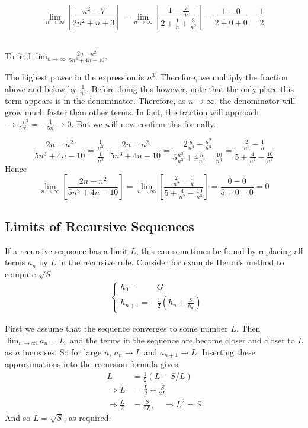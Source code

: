 \[
\lim_{n \to \infty } \left[ \frac{n^2-7}{2n^2+n+3} \right]=  \lim_{n \to \infty } \left[ \frac{1-\frac{7}{n^2}}{2+\frac{1}{n}+\frac{3}{n^2}}\right] = \frac{1-0}{2+0+0} = \frac{1}{2}
\]

\\
\noindent To find $\lim_{n \to \infty } \frac{2n-n^2}{5n^3+4n-10}$.

The highest power in the expression is $n^3$. Therefore, we multiply the fraction above and below by $\frac{1}{n^3}$. Before doing this however, note that the only place this term appears is in the denominator. Therefore, as $n \to \infty $, the denominator will grow much faster than other terms. In fact, the fraction will approach $\to \frac{-n^2}{5n^3}  = -\frac{1}{5n} \to 0$. But we will now confirm this formally.

\[
\frac{2n-n^2}{5n^3+4n-10} = \frac{\frac{1}{n^3}}{\frac{1}{n^3}}\cdot \frac{2n-n^2}{5n^3+4n-10} = \frac{2 \frac{n}{n^3}-\frac{n^2}{n^3}}{5 \frac{n^3}{n^3}+4 \frac{n}{n^3}-\frac{10}{n^3}} = \frac{\frac{2}{n^2}-\frac{1}{n}}{5+\frac{4}{n^2}-\frac{10}{n^3}}
\]
Hence
\[
\lim_{n \to \infty } \left[ \frac{2n-n^2}{5n^3+4n-10} \right]= \lim_{n \to \infty } \left[  \frac{\frac{2}{n^2}-\frac{1}{n}}{5+\frac{4}{n^2}-\frac{10}{n^3}} \right]= \frac{0-0}{5+0-0}=0
\]


\subsection*{Limits of Recursive Sequences}
If a recursive sequence has a limit $L$, this can sometimes be found by replacing all terms $a_{n}$ by $L$ in the recursive rule. Consider for example Heron's method to compute $\sqrt{S}$
\begin{align*}
  &\begin{cases}
    h_0=&G\\
    h_{n+1}=&\frac{1}{2} \left( h_n + \frac{S}{h_n} \right)
  \end{cases}
\end{align*}

First we assume that the sequence converges to some number $L$. Then $\lim_{n \to \infty} a_n=L$, and the terms in the sequence are become closer and closer to $L$ as $n$ increases. So for large $n$, $a_{n} \to  L$ and $a_{n+1}\to L$. Inserting these approximations into the recursion formula gives
\begin{align*}
  L&=\frac{1}{2}\left(L+S/L\right)\\
\Rightarrow L&=\frac{L}{2} + \frac{S}{2L}\\
\Rightarrow \frac{L}{2} &= \frac{S}{2L}, \quad \Rightarrow  L^2=S
\end{align*}
And so $L=\sqrt{S}$, as required.

